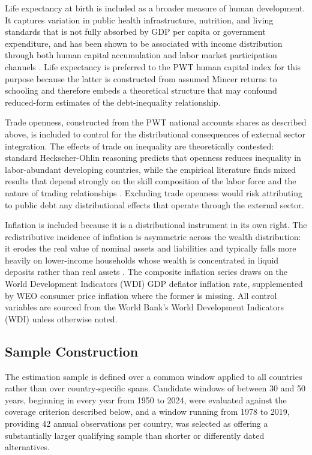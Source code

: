 \documentclass[12pt, titlepage]{article}
\numberwithin{equation}{section}
\begin{document}
Life expectancy at birth is included as a broader measure of human
development. It captures variation in public health infrastructure,
nutrition, and living standards that is not fully absorbed by GDP per capita
or government expenditure, and has been shown to be associated with income
distribution through both human capital accumulation and labor market
participation channels \citep{LondonoPrisca1996}. Life expectancy is
preferred to the PWT human capital index for this purpose because the latter
is constructed from assumed Mincer returns to schooling and therefore embeds
a theoretical structure that may confound reduced-form estimates of the
debt-inequality relationship.

Trade openness, constructed from the PWT national accounts shares as
described above, is included to control for the distributional consequences
of external sector integration. The effects of trade on inequality are
theoretically contested: standard Heckscher-Ohlin reasoning predicts that
openness reduces inequality in labor-abundant developing countries, while the
empirical literature finds mixed results that depend strongly on the skill
composition of the labor force and the nature of trading relationships
\citep{GoldbergPavcnik2007}. Excluding trade openness would risk attributing
to public debt any distributional effects that operate through the external
sector.

Inflation is included because it is a distributional instrument in its own
right. The redistributive incidence of inflation is asymmetric across the
wealth distribution: it erodes the real value of nominal assets and
liabilities and typically falls more heavily on lower-income households whose
wealth is concentrated in liquid deposits rather than real assets
\citep{DoepkeSchneider2006}. The composite inflation series draws on the
World Development Indicators (WDI) GDP deflator inflation rate, supplemented by WEO
consumer price inflation where the former is missing. All control variables
are sourced from the World Bank's World Development Indicators (WDI)
\citep{WorldBank2024} unless otherwise noted.

\subsection{Sample Construction}

The estimation sample is defined over a common window applied to all
countries rather than over country-specific spans. Candidate windows of
between 30 and 50 years, beginning in every year from 1950 to 2024, were
evaluated against the coverage criterion described below, and a window
running from 1978 to 2019, providing 42 annual observations per country, was
selected as offering a substantially larger qualifying sample than shorter or
differently dated alternatives.
\end{document}
